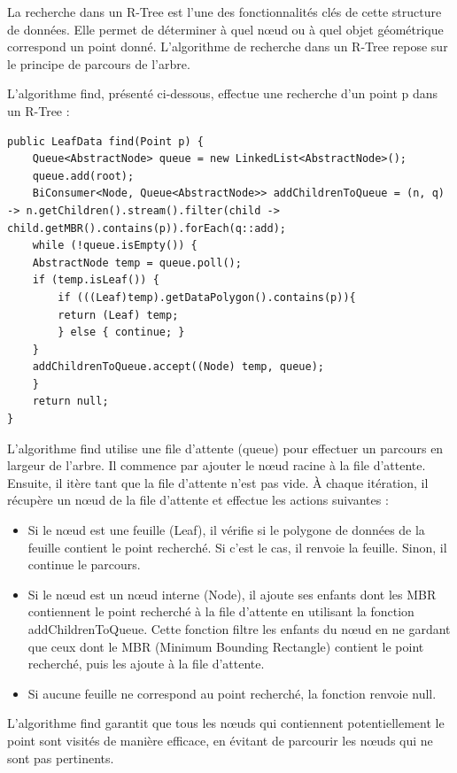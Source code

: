 \documentclass {article}
\begin{document}
La recherche dans un R-Tree est l'une des fonctionnalités clés de cette structure de données. 
Elle permet de déterminer à quel nœud ou à quel objet géométrique correspond un point donné. 
L'algorithme de recherche dans un R-Tree repose sur le principe de parcours de l'arbre.

L'algorithme find, présenté ci-dessous, effectue une recherche d'un point p dans un R-Tree :


\begin{verbatim}
public LeafData find(Point p) {
    Queue<AbstractNode> queue = new LinkedList<AbstractNode>();
    queue.add(root);
    BiConsumer<Node, Queue<AbstractNode>> addChildrenToQueue = (n, q) -> n.getChildren().stream().filter(child -> child.getMBR().contains(p)).forEach(q::add);
    while (!queue.isEmpty()) {
	AbstractNode temp = queue.poll();
	if (temp.isLeaf()) {
	    if (((Leaf)temp).getDataPolygon().contains(p)){
		return (Leaf) temp;
	    } else { continue; }
	}
	addChildrenToQueue.accept((Node) temp, queue);
    }
    return null;
}
\end{verbatim}

L'algorithme find utilise une file d'attente (queue) pour effectuer un parcours en largeur de l'arbre. 
Il commence par ajouter le nœud racine à la file d'attente. Ensuite, il itère tant que la file d'attente 
n'est pas vide. À chaque itération, il récupère un nœud de la file d'attente et effectue les actions suivantes :

\begin{itemize}
    \item Si le nœud est une feuille (Leaf), il vérifie si le polygone de données de la feuille contient le point 
	recherché. Si c'est le cas, il renvoie la feuille. 
	Sinon, il continue le parcours.
    \item Si le nœud est un nœud interne (Node), il ajoute ses enfants dont les MBR contiennent le point 
	recherché à la file d'attente en utilisant la fonction addChildrenToQueue. 
	Cette fonction filtre les enfants du nœud en ne gardant que ceux dont le MBR (Minimum Bounding Rectangle) 
	contient le point recherché, puis les ajoute à la file d'attente.
    \item Si aucune feuille ne correspond au point recherché, la fonction renvoie null.
\end{itemize}

L'algorithme find garantit que tous les nœuds qui contiennent potentiellement le point sont visités de manière 
efficace, en évitant de parcourir les nœuds qui ne sont pas pertinents.
\end{document}
